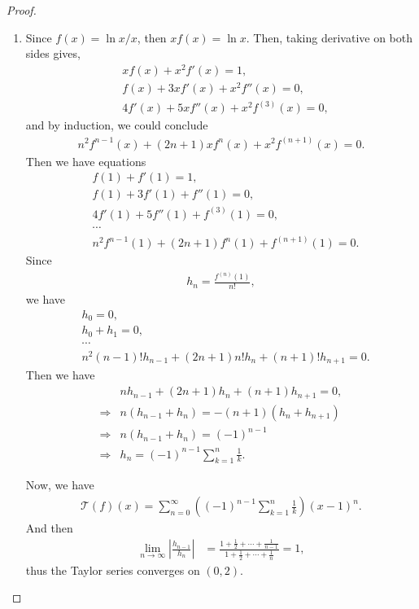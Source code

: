 \documentclass[11pt]{article}
\theoremstyle{definition}
\numberwithin{equation}{subsection}
\begin{document}
\begin{proof}
~\begin{enumerate}[label=(\alph*)]
    \item Since $f(x) = \ln x / x$, then $xf(x) = \ln x$. Then, taking derivative on both sides gives,
    \begin{align*}
        & xf(x) + x^2 f'(x) = 1, \\
        & f(x) + 3x f'(x) + x^2 f''(x) = 0, \\
        & 4f'(x) + 5x f''(x) + x^2 f^{(3)}(x) = 0,
    \end{align*}
    and by induction, we could conclude
    \begin{align*}
        n^2 f^{n-1}(x) + (2n + 1)x f^{n}(x) + x^2 f^{(n+1)}(x) = 0.
    \end{align*}
    Then we have equations
    \begin{align*}
        & f(1) + f'(1) = 1, \\
        & f(1) + 3f'(1) + f''(1) = 0, \\
        & 4f'(1) + 5f''(1) + f^{(3)}(1) = 0, \\
        & \cdots \\
        & n^2 f^{n-1}(1) + (2n + 1) f^{n}(1) + f^{(n+1)}(1) = 0.
    \end{align*}
    Since 
    \begin{align*}
        h_n = \frac{f^{(n)}(1)}{n!},
    \end{align*}
    we have
    \begin{align*}
        & h_0 = 0, \\
        & h_0 + h_1 = 0, \\
        & \cdots \\
        & n^2 (n-1)! h_{n-1} + (2n + 1) n! h_n + (n + 1)! h_{n+1} = 0.
    \end{align*}
    Then we have
    \begin{align*}
        & n h_{n-1} + (2n + 1) h_n + (n + 1) h_{n+1} = 0, \\
        \Rightarrow & n (h_{n-1} + h_n) = - (n + 1) (h_n + h_{n+1}) \\
        \Rightarrow & n (h_{n-1} + h_n) = (-1)^{n-1} \\
        \Rightarrow & h_n = (-1)^{n-1} \sum^n_{k=1} \frac{1}{k}.
    \end{align*}
    
    Now, we have 
    \begin{align*}
        \mathcal{T}(f)(x) = \sum^\infty_{n = 0} \left( (-1)^{n-1} \sum^n_{k=1} \frac{1}{k} \right) (x - 1)^n.
    \end{align*}
    And then 
    \begin{align*}
        \lim_{n\to\infty} \left| \frac{h_{n-1}}{h_n} \right| & = \frac{1 + \frac{1}{2} + \cdots + \frac{1}{n-1}}{1 + \frac{1}{2} + \cdots + \frac{1}{n}} = 1, 
    \end{align*}
    thus the Taylor series converges on $(0,2)$.
    

\end{enumerate}
\end{proof}
\end{document}
